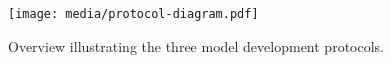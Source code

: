 \begin{figure}[H]
    \centering
    \texttt{[image: media/protocol-diagram.pdf]}
    \caption{Overview illustrating the three model development protocols.}\label{fig:protocols}
\end{figure}